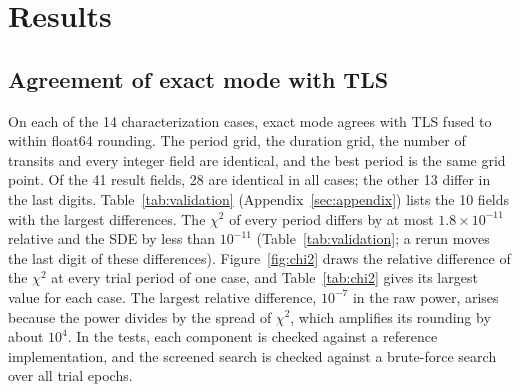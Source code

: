 \documentclass{aastex631}
\begin{document}
\section{Results}\label{sec:results}

\subsection{Agreement of exact mode with TLS}\label{sec:correctness}
On each of the 14 characterization cases, exact mode agrees with TLS fused to within float64 rounding. The period grid, the duration grid, the number of transits and every integer field are identical, and the best period is the same grid point. Of the 41 result fields, 28 are identical in all cases; the other 13 differ in the last digits. Table~\ref{tab:validation} (Appendix~\ref{sec:appendix}) lists the 10 fields with the largest differences. The $\chi^2$ of every period differs by at most $1.8\times10^{-11}$ relative and the SDE by less than $10^{-11}$ (Table~\ref{tab:validation}; a rerun moves the last digit of these differences). Figure~\ref{fig:chi2} draws the relative difference of the $\chi^2$ at every trial period of one case, and Table~\ref{tab:chi2} gives its largest value for each case. The largest relative difference, $10^{-7}$ in the raw power, arises because the power divides by the spread of $\chi^2$, which amplifies its rounding by about $10^4$. In the tests, each component is checked against a reference implementation, and the screened search is checked against a brute-force search over all trial epochs.
\end{document}
